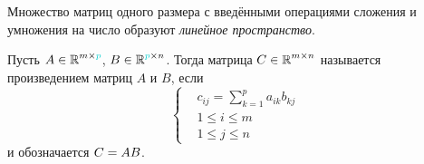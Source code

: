 \documentclass[a4paper,12pt]{article}
\theoremstyle{remark}
\begin{document}
  \begin{remark}
    Множество матриц одного размера с введёнными операциями сложения и умножения на число образуют \emph{линейное пространство}.
  \end{remark}
  
  \begin{definition}\label{def:matrix-multiplication}
    Пусть $A \hm\in \RR^{m \times \textcolor{light-cyan}{p}}$, $B \hm\in \RR^{\textcolor{light-cyan}{p} \times n}$.
    Тогда матрица $C \hm\in \RR^{m \times n}$ называется произведением матриц $A$ и $B$, если
    \[
      \left\{
        \begin{aligned}
          &c_{ij} = \sum_{k = 1}^p a_{ik} b_{kj}\\
          &1 \leq i \leq m\\
          &1 \leq j \leq n
        \end{aligned}
      \right.
    \]
    и обозначается $C \hm= AB$.
  \end{definition}
  
\end{document}
